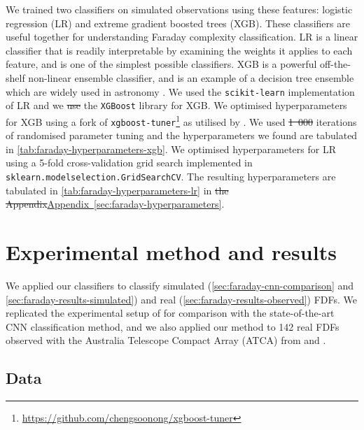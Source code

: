 \documentclass[11pt, a4paper]{book}
\newcommand{\aref}[1]{\hyperref[#1]{Appendix~\ref{#1}}}
\providecommand{\DIFaddtex}[1]{{\protect\color{blue}\uwave{#1}}} %
\providecommand{\DIFdeltex}[1]{{\protect\color{red}\sout{#1}}}                      %
\providecommand{\DIFaddbegin}{} %
\providecommand{\DIFaddend}{} %
\providecommand{\DIFdelbegin}{} %
\providecommand{\DIFdelend}{} %
\providecommand{\DIFadd}[1]{\texorpdfstring{\DIFaddtex{#1}}{#1}} %
\providecommand{\DIFdel}[1]{\texorpdfstring{\DIFdeltex{#1}}{}} %
\newcommand{\DIFscaledelfig}{0.5}
\newlength{\DIFdelgraphicswidth} %
\newlength{\DIFdelgraphicsheight} %
\newcommand{\DIFaddincludegraphics}[2][]{{\color{blue}\fbox{\DIFOincludegraphics[#1]{#2}}}} %
\newcommand{\DIFdelincludegraphics}[2][]{%
\sbox{\DIFdelgraphicsbox}{\DIFOincludegraphics[#1]{#2}}%
\settoboxwidth{\DIFdelgraphicswidth}{\DIFdelgraphicsbox} %
\settoboxtotalheight{\DIFdelgraphicsheight}{\DIFdelgraphicsbox} %
\scalebox{\DIFscaledelfig}{%
\parbox[b]{\DIFdelgraphicswidth}{\usebox{\DIFdelgraphicsbox}\\[-\baselineskip] \rule{\DIFdelgraphicswidth}{0em}}\llap{\resizebox{\DIFdelgraphicswidth}{\DIFdelgraphicsheight}{%
\setlength{\unitlength}{\DIFdelgraphicswidth}%
\begin{picture}(1,1)%
\thicklines\linethickness{2pt} %
{\color[rgb]{1,0,0}\put(0,0){\framebox(1,1){}}}%
{\color[rgb]{1,0,0}\put(0,0){\line( 1,1){1}}}%
{\color[rgb]{1,0,0}\put(0,1){\line(1,-1){1}}}%
\end{picture}%
}\hspace*{3pt}}} %
} %
\DeclareRobustCommand{\DIFaddbegin}{\DIFOaddbegin \let\includegraphics\DIFaddincludegraphics} %
\DeclareRobustCommand{\DIFaddend}{\DIFOaddend \let\includegraphics\DIFOincludegraphics} %
\DeclareRobustCommand{\DIFdelbegin}{\DIFOdelbegin \let\includegraphics\DIFdelincludegraphics} %
\DeclareRobustCommand{\DIFdelend}{\DIFOaddend \let\includegraphics\DIFOincludegraphics} %
\begin{document}
    We trained two classifiers on simulated observations using these features: logistic regression (LR) and extreme gradient boosted trees (XGB). These classifiers are useful together for understanding Faraday complexity classification. LR is a linear classifier that is readily interpretable by examining the weights it applies to each feature, and is one of the simplest possible classifiers. XGB is a powerful off-the-shelf non-linear ensemble classifier, and is an example of a decision tree ensemble which are widely used in astronomy \citep[e.g.][]{machado_poletti_valle_shaping_2020,hlozek20lsst}. We used the \texttt{scikit-learn} implementation of LR and we \DIFdelbegin \DIFdel{use }\DIFdelend \DIFaddbegin \DIFadd{used }\DIFaddend the \texttt{XGBoost} library for XGB. We optimised hyperparameters for XGB using a fork of \texttt{xgboost-tuner}\footnote{\url{https://github.com/chengsoonong/xgboost-tuner}} as utilised by \citet{zhu20mutagenic}. We used \DIFdelbegin \DIFdel{1~000 }\DIFdelend \DIFaddbegin \DIFadd{1000 }\DIFaddend iterations of randomised parameter tuning and the hyperparameters we found are tabulated in \autoref{tab:faraday-hyperparameters-xgb}. We optimised hyperparameters for LR using a 5-fold cross-validation grid search implemented in \texttt{sklearn.model\textunderscore{}selection.GridSearchCV}. The resulting hyperparameters are tabulated in \autoref{tab:faraday-hyperparameters-lr} in \DIFdelbegin \DIFdel{the Appendix}\DIFdelend \DIFaddbegin \aref{sec:faraday-hyperparameters}\DIFaddend .

\section{Experimental method and results}
\label{sec:faraday-experiment-classification}

  We applied our classifiers to classify simulated (\autoref{sec:faraday-cnn-comparison} and \ref{sec:faraday-results-simulated}) and real (\autoref{sec:faraday-results-observed}) FDFs. We replicated the experimental setup of \citet{brown_classifying_2018} for comparison with the state-of-the-art CNN classification method, and we also applied our method to 142 real FDFs observed with the Australia Telescope Compact Array (ATCA) from \citet{livingston21faraday} and \citet{osullivan_broad-band_2017}.

  \subsection{Data}
\end{document}
